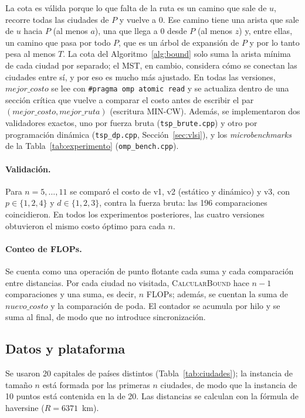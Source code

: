 \documentclass[12pt,a4paper]{article}
\begin{document}
La cota es válida porque lo que falta de la ruta es un camino que sale de $u$, recorre todas las ciudades de $P$ y vuelve a $0$. Ese camino tiene una arista que sale de $u$ hacia $P$ (al menos $a$), una que llega a $0$ desde $P$ (al menos $z$) y, entre ellas, un camino que pasa por todo $P$, que es un árbol de expansión de $P$ y por lo tanto pesa al menos $T$. La cota del Algoritmo~\ref{alg:bound} solo suma la arista mínima de cada ciudad por separado; el MST, en cambio, considera cómo se conectan las ciudades entre sí, y por eso es mucho más ajustado.
En todas las versiones, $mejor\_costo$ se lee con \texttt{\#pragma omp atomic read} y se actualiza dentro de una sección crítica que vuelve a comparar el costo antes de escribir el par $(mejor\_costo, mejor\_ruta)$ (escritura MIN-CW). Además, se implementaron dos validadores exactos, uno por fuerza bruta (\texttt{tsp\_brute.cpp}) y otro por programación dinámica (\texttt{tsp\_dp.cpp}, Sección~\ref{sec:vlsi}), y los \textit{microbenchmarks} de la Tabla~\ref{tab:experimento} (\texttt{omp\_bench.cpp}).

\paragraph{Validación.} Para $n=5,\dots,11$ se comparó el costo de v1, v2 (estático y dinámico) y v3, con $p\in\{1,2,4\}$ y $d\in\{1,2,3\}$, contra la fuerza bruta: las 196 comparaciones coincidieron. En todos los experimentos posteriores, las cuatro versiones obtuvieron el mismo costo óptimo para cada $n$.

\paragraph{Conteo de FLOPs.} Se cuenta como una operación de punto flotante cada suma y cada comparación entre distancias. Por cada ciudad no visitada, \textsc{CalcularBound} hace $n-1$ comparaciones y una suma, es decir, $n$ FLOPs; además, se cuentan la suma de $nuevo\_costo$ y la comparación de poda. El contador se acumula por hilo y se suma al final, de modo que no introduce sincronización.

\subsection{Datos y plataforma}
Se usaron 20 capitales de países distintos (Tabla~\ref{tab:ciudades}); la instancia de tamaño $n$ está formada por las primeras $n$ ciudades, de modo que la instancia de 10 puntos está contenida en la de 20. Las distancias se calculan con la fórmula de haversine ($R = 6371$~km).
\end{document}
